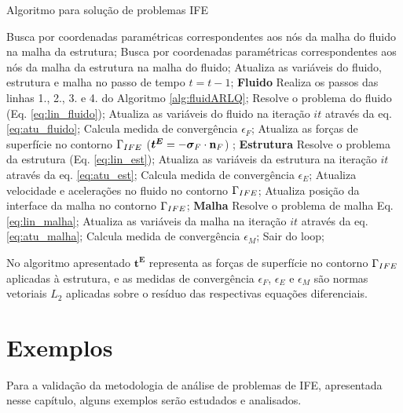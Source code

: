 \documentclass[tese_patricia]{subfiles}
\begin{document}
\begin{algorithm}
	\caption{Algoritmo para solução de problemas IFE}
	\label{alg:IFE}
	\begin{algorithmic}[1]
		\State Busca por coordenadas paramétricas correspondentes aos nós da malha do fluido na malha da estrutura;
		\State Busca por coordenadas paramétricas correspondentes aos nós da malha da estrutura na malha do fluido;
		\State Atualiza as variáveis do fluido, estrutura e malha no passo de tempo $t = t-1$;
		\State \textbf{Fluido}
		\State Realiza os passos das linhas 1., 2., 3. e 4. do Algoritmo \ref{alg:fluidARLQ};
		\State Resolve o problema do fluido (Eq. \eqref{eq:lin_fluido});
		\State Atualiza as variáveis do fluido na iteração $it$ através da eq. \ref{eq:atu_fluido};
		\State Calcula medida de convergência $\epsilon_F$;
		\State Atualiza as forças de superfície no contorno  $\Gamma_{IFE}$ ($\boldsymbol{t^{E}} = -\boldsymbol{\sigma}_{F} \cdot \mathbf{n}_{F}$) ;
		\State \textbf{Estrutura}
		\State Resolve o problema da estrutura (Eq. \eqref{eq:lin_est});
		\State Atualiza as variáveis da estrutura na iteração $it$ através da eq. \eqref{eq:atu_est};
		\State Calcula medida de convergência $\epsilon_E$;
		\State Atualiza velocidade e acelerações no fluido no contorno  $\Gamma_{IFE}$;
		\State Atualiza posição da interface da malha no contorno  $\Gamma_{IFE}$;
		\State \textbf{Malha}
		\State Resolve o problema de malha Eq. \eqref{eq:lin_malha};
		\State Atualiza as variáveis da malha na iteração $it$ através da eq. \eqref{eq:atu_malha};
		\State Calcula medida de convergência $\epsilon_M$;
		\State Sair do loop;
		\EndIf
		\EndFor
		\EndFor
	\end{algorithmic}
\end{algorithm}

No algoritmo apresentado $\boldsymbol{t^{E}}$ representa as forças de superfície no contorno $\Gamma_{IFE}$ aplicadas à estrutura, e as medidas de convergência $\epsilon_F$, $\epsilon_E$ e $\epsilon_M$ são normas vetoriais $L_2$ aplicadas sobre o resíduo das respectivas equações diferenciais.


\section{Exemplos}

Para a validação da metodologia de análise de problemas de IFE, apresentada nesse capítulo, alguns exemplos serão estudados e analisados.
\end{document}
